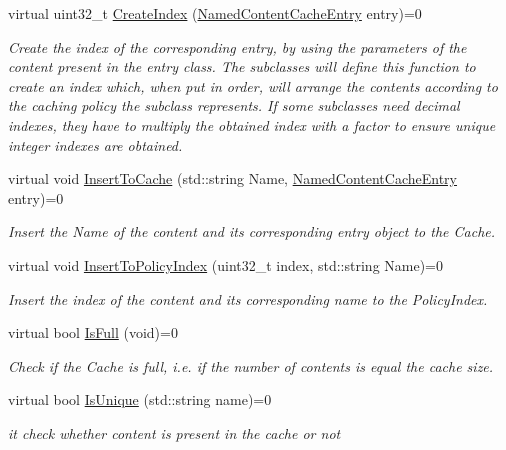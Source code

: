 \begin{DoxyCompactItemize}
virtual uint32\-\_\-t \hyperlink{classns3_1_1NamedContentCache_a75be49c2ad5db93bdf8aaed813dcf304}{Create\-Index} (\hyperlink{classns3_1_1NamedContentCacheEntry}{Named\-Content\-Cache\-Entry} entry)=0
\begin{DoxyCompactList}\small\item\em Create the index of the corresponding entry, by using the parameters of the content present in the entry class. The subclasses will define this function to create an index which, when put in order, will arrange the contents according to the caching policy the subclass represents. If some subclasses need decimal indexes, they have to multiply the obtained index with a factor to ensure unique integer indexes are obtained. \end{DoxyCompactList}\item 
virtual void \hyperlink{classns3_1_1NamedContentCache_a56a23add9b5bc03908793cf261ccb5f8}{Insert\-To\-Cache} (std\-::string Name, \hyperlink{classns3_1_1NamedContentCacheEntry}{Named\-Content\-Cache\-Entry} entry)=0
\begin{DoxyCompactList}\small\item\em Insert the Name of the content and its corresponding entry object to the Cache. \end{DoxyCompactList}\item 
virtual void \hyperlink{classns3_1_1NamedContentCache_ac248e647f56a6fef10285b1c654b8180}{Insert\-To\-Policy\-Index} (uint32\-\_\-t index, std\-::string Name)=0
\begin{DoxyCompactList}\small\item\em Insert the index of the content and its corresponding name to the Policy\-Index. \end{DoxyCompactList}\item 
virtual bool \hyperlink{classns3_1_1NamedContentCache_a1ceeaf5b85d3571225adfe2d48caf126}{Is\-Full} (void)=0
\begin{DoxyCompactList}\small\item\em Check if the Cache is full, i.\-e. if the number of contents is equal the cache size. \end{DoxyCompactList}\item 
virtual bool \hyperlink{classns3_1_1NamedContentCache_a4c4a79310c99f9c8ad6227d3b380dc20}{Is\-Unique} (std\-::string name)=0
\begin{DoxyCompactList}\small\item\em it check whether content is present in the cache or not \end{DoxyCompactList}\item 

\end{DoxyCompactItemize}
